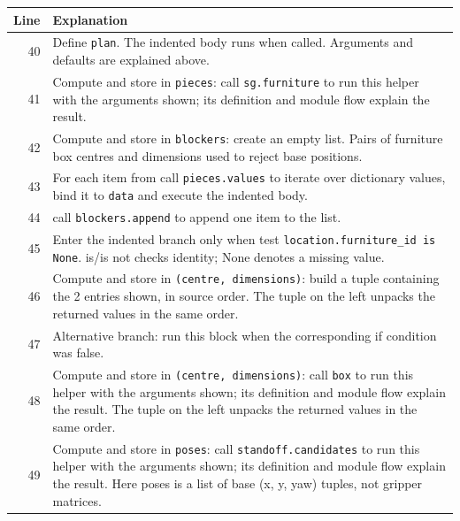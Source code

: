 \documentclass[11pt,a4paper]{book}
\begin{document}
\begin{longtable}{r p{}}

\textbf{Line} & \textbf{Explanation} \\ \hline \endhead

40 & Define \texttt{plan}. The indented body runs when called. Arguments and defaults are explained above. \\

41 & Compute and store in \texttt{pieces}: call \texttt{sg.furniture} to run this helper with the arguments shown; its definition and module flow explain the result.  \\

42 & Compute and store in \texttt{blockers}: create an empty list. Pairs of furniture box centres and dimensions used to reject base positions. \\

43 & For each item from call \texttt{pieces.values} to iterate over dictionary values, bind it to \texttt{data} and execute the indented body. \\

44 & call \texttt{blockers.append} to append one item to the list. \\

45 & Enter the indented branch only when test \texttt{location.furniture\_id is None}. is/is not checks identity; None denotes a missing value. \\

46 & Compute and store in \texttt{(centre, dimensions)}: build a tuple containing the 2 entries shown, in source order. The tuple on the left unpacks the returned values in the same order. \\

47 & Alternative branch: run this block when the corresponding if condition was false. \\

48 & Compute and store in \texttt{(centre, dimensions)}: call \texttt{box} to run this helper with the arguments shown; its definition and module flow explain the result. The tuple on the left unpacks the returned values in the same order. \\

49 & Compute and store in \texttt{poses}: call \texttt{standoff.candidates} to run this helper with the arguments shown; its definition and module flow explain the result. Here poses is a list of base (x, y, yaw) tuples, not gripper matrices. \\


\end{longtable}
\end{document}
